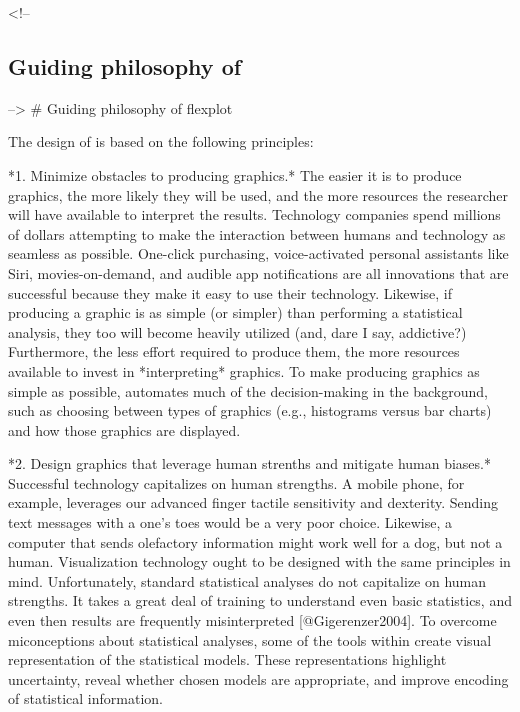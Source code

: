 <!-- \subsection[Guiding philosophy of flexplot]{Guiding philosophy of } \label{sec:philosophy} -->
# Guiding philosophy of flexplot

The design of  is based on the following principles: 

*1. Minimize obstacles to producing graphics.* The easier it is to produce graphics, the more likely they will be used, and the more resources the researcher will have available to interpret the results. Technology companies spend millions of dollars attempting to make the interaction between humans and technology as seamless as possible. One-click purchasing, voice-activated personal assistants like Siri, movies-on-demand, and audible app notifications are all innovations that are successful because they make it easy to use their technology. Likewise, if producing a graphic is as simple (or simpler) than performing a statistical analysis, they too will become heavily utilized (and, dare I say, addictive?) Furthermore, the less effort required to produce them, the more resources available to invest in *interpreting* graphics. To make producing graphics as simple as possible,  automates much of the decision-making in the background, such as choosing between types of graphics (e.g., histograms versus bar charts) and how those graphics are displayed.

*2. Design graphics that leverage human strenths and mitigate human biases.* Successful technology capitalizes on human strengths. A mobile phone, for example, leverages our advanced finger tactile sensitivity and dexterity. Sending text messages with a one's toes would be a very poor choice. Likewise, a computer that sends olefactory information might work well for a dog, but not a human. Visualization technology ought to be designed with the same principles in mind. Unfortunately, standard statistical analyses do not capitalize on human strengths. It takes a great deal of training to understand even basic statistics, and even then results are frequently misinterpreted [@Gigerenzer2004]. To overcome miconceptions about statistical analyses, some of the tools within  create visual representation of the statistical models. These representations highlight uncertainty, reveal whether chosen models are appropriate, and improve encoding of statistical information. 

